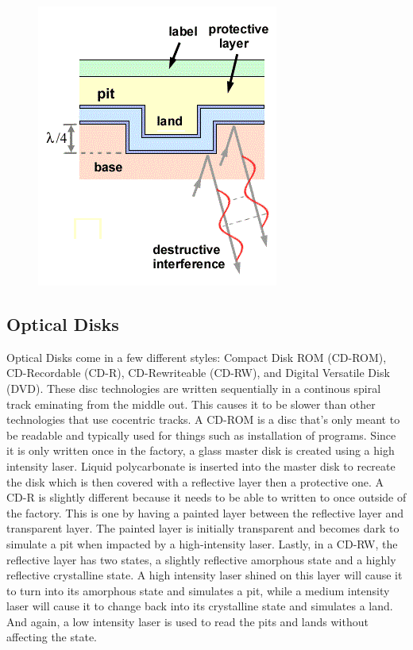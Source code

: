 \documentclass[ aip, 12pt]{revtex4-1} %
\begin{document}
\begin{figure}[H]
\centerline{\includegraphics[scale=.9]{cdRom.png}}
\caption{ }
\label{cdRom}
\end{figure} 
\subsection{Optical Disks}
Optical Disks come in a few different styles: Compact Disk ROM (CD-ROM), CD-Recordable (CD-R), CD-Rewriteable (CD-RW), and Digital Versatile Disk (DVD). These disc technologies are written sequentially in a continous spiral track eminating from the middle out. This causes it to be slower than other technologies that use cocentric tracks. A CD-ROM is a disc that's only meant to be readable and typically used for things such as installation of programs. Since it is only written once in the factory, a glass master disk is created using a high intensity laser. Liquid polycarbonate is inserted into the master disk to recreate the disk which is then covered with a reflective layer then a protective one. 
A CD-R is slightly different because it needs to be able to written to once outside of the factory. This is one by having a painted layer between the reflective layer and transparent layer. The painted layer is initially transparent and becomes dark to simulate a pit when impacted by a high-intensity laser. Lastly, in a CD-RW, the reflective layer has two states, a slightly reflective amorphous state and a highly reflective crystalline state. A high intensity laser shined on this layer will cause it to turn into its amorphous state and simulates a pit, while a medium intensity laser will cause it to change back into its crystalline state and simulates a land. And again, a low intensity laser is used to read the pits and lands without affecting the state.
\end{document}
